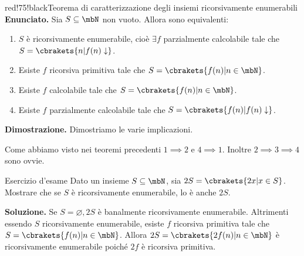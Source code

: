 \begin{halfframedbox}{red!75!black}{Teorema di caratterizzazione degli insiemi ricorsivamente enumerabili}
  \textbf{Enunciato. } Sia \(S \subseteq \mbN\) non vuoto. Allora sono equivalenti:
  \begin{enumerate}
    \item \(S\) è ricorsivamente enumerabile, cioè \(\exists f\) parzialmente calcolabile tale che \(S=\cbrakets{n \vert f(n) \downarrow}\).
    \item Esiste \(f\) ricorsiva primitiva tale che \(S=\cbrakets{f(n) \vert n \in \mbN}\).
    \item Esiste \(f\) calcolabile tale che \(S=\cbrakets{f(n) \vert n \in \mbN}\).
    \item Esiste \(f\) parzialmente calcolabile tale che \(S=\cbrakets{f(n) \vert f(n) \downarrow}\).
  \end{enumerate}
\begin{center}
  \textcolor{red!75!black}{\hdashrule[0.5ex]{18cm}{1pt}{3mm 3pt 1mm 2pt}}
\end{center}

\textbf{Dimostrazione. } Dimostriamo le varie implicazioni.

Come abbiamo visto nei teoremi precedenti \(1 \implies 2\) e \(4 \implies 1\). Inoltre \(2 \implies 3 \implies 4\) sono ovvie.
\end{halfframedbox}

\begin{generalbox}[colframe=azure-gradient-3!90!black]{Esercizio d'esame}
  Dato un insieme \(S \subseteq \mbN\), sia \(2S=\cbrakets{2x \vert x \in S}\). Mostrare che se \(S\) è ricorsivamente enumerabile, lo è anche \(2S\).

  \textbf{Soluzione. } Se \(S= \varnothing, 2S\) è banalmente ricorsivamente enumerabile. Altrimenti essendo \(S\) ricorsivamente enumerabile, esiste \(f\) ricorsiva primitiva tale che \(S=\cbrakets{f(n) \vert n \in \mbN}\). Allora \(2S=\cbrakets{2f(n) \vert n \in \mbN}\) è ricorsivamente enumerabile poiché \(2f\) è ricorsiva primitiva.
\end{generalbox}